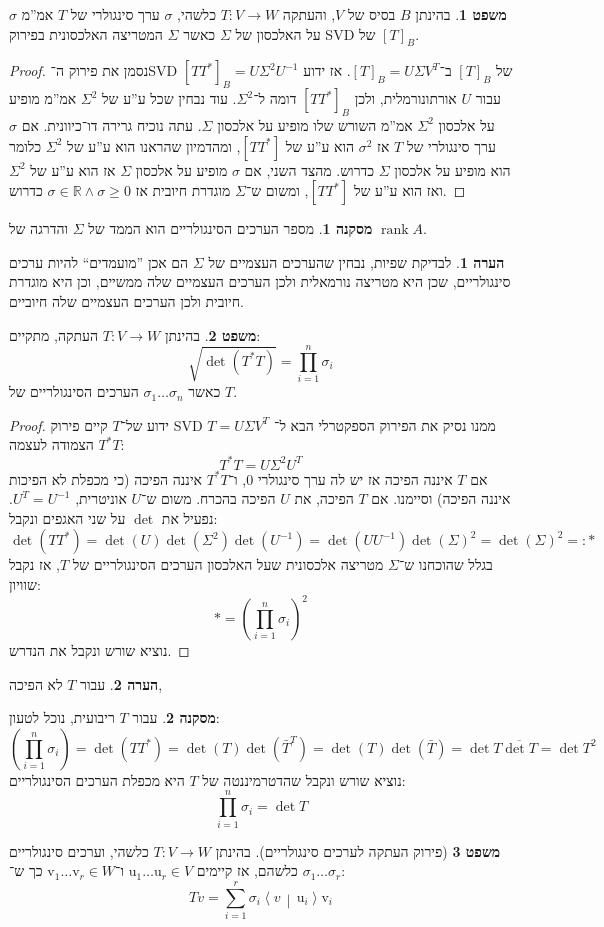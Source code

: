 \documentclass[a4paper]{article}
\newcommand\R     {\mathbb{R}}
\newcommand\vrm   {\bm{\mathrm{v}}}
\newcommand\urm   {\bm{\mathrm{u}}}
\newcommand\ra    {\rangle}
\newcommand\la    {\langle}
\DeclareMathOperator{\rk}      {rank}
\newcommand\co        {\colon}
\newcommand\mut [2]   {\left \la #1 \,\middle|\, #2 \right \ra}
\newcommand\sg        {\sigma}
\newcommand\Sg        {\Sigma}
\newcommand\op    {^{-1}}
\newcommand\cl [1]    {\left ( #1 \right )}
\theoremstyle{definition}
\newtheorem{Theorem}{\color{myblue}משפט}
\newtheorem{Remark}{\color{mycyan}הערה}
\newtheorem{Collary}{\color{mymagenta}מסקנה}
\newcommand\cola [1] {\begin{Collary}#1\end{Collary}}
\newcommand\theo  [1] {\begin{Theorem}#1\end{Theorem}}
\newcommand\rmark [1] {\begin{Remark}#1\end{Remark}}
\begin{document}
	\begin{Theorem}
		בהינתן $B$ בסיס של $V$, והעתקה $T \co V \to W$ כלשהי, $\sg$ ערך סינגולרי של $T$ אמ''מ $\sg$ על האלכסון של $\Sg$ כאשר $\Sg$ המטריצה האלכסונית בפירוק SVD של $[T]_B$. 
	\end{Theorem}
	\begin{proof}
		נסמן את פירוק ה־SVD של $[T]_B$ ב־$[T]_B = U\Sg V^{T}$. אז ידוע $[TT^*]_B = U\Sg^2 U\op$ עבור $U$ אורתונורמלית, ולכן $[TT^*]_B$ דומה ל־$\Sg^2$. עוד נבחין שכל ע''ע של $\Sg^2$ אמ''מ מופיע על אלכסון $\Sg^2$ אמ''מ השורש שלו מופיע על אלכסון $\Sg$. עתה נוכיח גרירה דו־כיוונית. אם $\sg$ ערך סינגולרי של $T$ אז $\sg^2$ הוא ע''ע של $[TT^*]$, ומהדמיון שהראנו הוא ע''ע של $\Sg^2$ כלומר הוא מופיע על אלכסון $\Sg$ כדרוש. מהצד השני, אם $\sg$ מופיע על אלכסון $\Sg$ אז הוא ע''ע של $\Sg^2$ ואז הוא ע''ע של $[TT^*]$, ומשום ש־$\Sg$ מוגדרת חיובית אז $\sg \in \R \land \sg \ge 0$ כדרוש. 
	\end{proof}
	\cola{מספר הערכים הסינגולריים הוא הממד של $\Sg$ והדרגה של $\rk A$. }
	\rmark{לבדיקת שפיות, נבחין שהערכים העצמיים של $\Sg$ הם אכן ''מועמדים`` להיות ערכים סינגולריים, שכן היא מטריצה נורמאלית ולכן הערכים העצמיים שלה ממשיים, וכן היא מוגדרת חיובית ולכן הערכים העצמיים שלה חיוביים. }
	
	\theo{בהינתן $T \co V \to W$ העתקה, מתקיים: 
	\[ \sqrt{\det(T^*T)} = \prod_{i = 1}^{n}\sg_i \]
	כאשר $\sg_1 \dots \sg_n$ הערכים הסינגולריים של $T$. 
	}
	\begin{proof}
		ידוע של־$T$ קיים פירוק SVD $T = U\Sg V^T$ ממנו נסיק את הפירוק הספקטרלי הבא ל־$T^*T$ הצמודה לעצמה:
		\[ T^*T = U\Sg^2U^T \]
		אם $T$ איננה הפיכה אז יש לה ערך סינגולרי $0$, ו־$T^*T$ איננה הפיכה (כי מכפלת לא הפיכות איננה הפיכה) וסיימנו. 
		אם $T$ הפיכה, את $U$ הפיכה בהכרח. משום ש־$U$ אוניטרית, $U^T = U\op$. נפעיל את $\det$ על שני האגפים ונקבל: 
		\[ \det(TT^*) = \det(U)\det(\Sg^2)\det(U\op) = \det(UU\op)\det(\Sg)^{2} = \det(\Sg)^2 =: * \]
		בגלל שהוכחנו ש־$\Sg$ מטריצה אלכסונית שעל האלכסון הערכים הסינגולריים של $T$, אז נקבל שוויון: 
		\[ * = \cl{\prod_{i = 1}^{n}\sg_i}^{2} \]
		נוציא שורש ונקבל את הנדרש. 
	\end{proof}
	\rmark{עבור $T$ לא הפיכה, }
	\cola{עבור $T$ ריבועית, נוכל לטעון: 
	\[ \cl{\prod_{i = 1}^{n}\sg_i} = \det(TT^*) = \det(T)\det(\bar T^T) = \det(T) \det (\bar T) = \det T \overline{\det T} = \det T^2 \]
	נוציא שורש ונקבל שהדטרמיננטה של $T$ היא מכפלת הערכים הסינגולריים: 
	\[ \prod_{i = 1}^{n} \sg_i = \det T \]}
	
	
	\begin{Theorem}[פירוק העתקה לערכים סינגולריים]
		בהינתן $T \co V \to W$ כלשהי, וערכים סינגולריים $\sg_1 \dots \sg_r$ כלשהם, אז קיימים $\urm_1 \dots \urm_r \in V$ ו־$\vrm_1 \dots \vrm_r \in W$ כך ש־: 
		\[ Tv = \sum_{i = 1}^{r}\sg_i \mut{v}{\urm_i}\vrm_i \]
	\end{Theorem}
	
\end{document}
